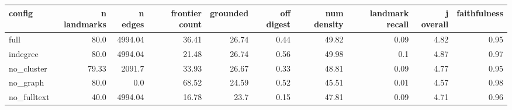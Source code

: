 \begin{tabular}{lrrrrrrrrr}
\toprule
config & n landmarks & n edges & frontier count & grounded & off digest & num density & landmark recall & j overall & faithfulness \\
\midrule
full & 80.0 & 4994.04 & 36.41 & 26.74 & 0.44 & 49.82 & 0.09 & 4.82 & 0.95 \\
indegree & 80.0 & 4994.04 & 21.48 & 26.74 & 0.56 & 49.98 & 0.1 & 4.87 & 0.97 \\
no\_cluster & 79.33 & 2091.7 & 33.93 & 26.67 & 0.33 & 48.81 & 0.09 & 4.77 & 0.95 \\
no\_graph & 80.0 & 0.0 & 68.52 & 24.59 & 0.52 & 45.51 & 0.01 & 4.57 & 0.98 \\
no\_fulltext & 40.0 & 4994.04 & 16.78 & 23.7 & 0.15 & 47.81 & 0.09 & 4.71 & 0.96 \\
\bottomrule
\end{tabular}
